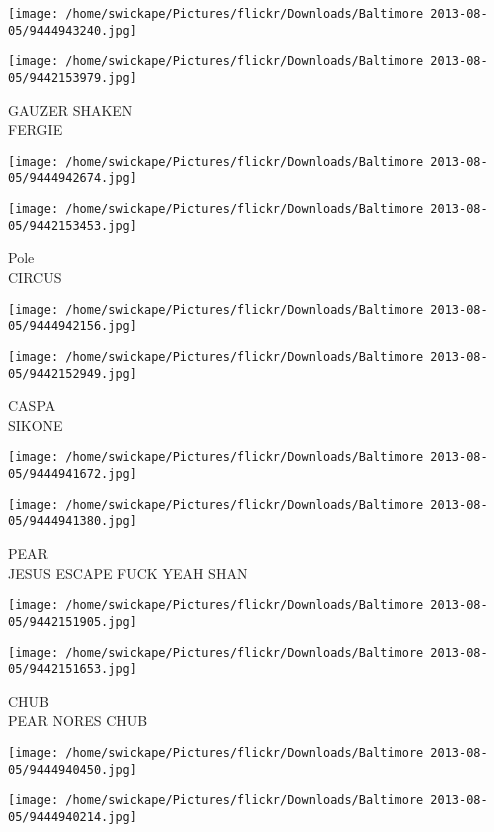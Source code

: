 \documentclass[10pt,letterpaper]{article}
\begin{document}
\texttt{[image: /home/swickape/Pictures/flickr/Downloads/Baltimore 2013-08-05/9444943240.jpg]}

\vspace{0.25in}
\texttt{[image: /home/swickape/Pictures/flickr/Downloads/Baltimore 2013-08-05/9442153979.jpg]}

GAUZER SHAKEN\\
FERGIE
\pagebreak

\texttt{[image: /home/swickape/Pictures/flickr/Downloads/Baltimore 2013-08-05/9444942674.jpg]}

\vspace{0.25in}
\texttt{[image: /home/swickape/Pictures/flickr/Downloads/Baltimore 2013-08-05/9442153453.jpg]}

Pole\\
CIRCUS
\pagebreak

\texttt{[image: /home/swickape/Pictures/flickr/Downloads/Baltimore 2013-08-05/9444942156.jpg]}

\vspace{0.25in}
\texttt{[image: /home/swickape/Pictures/flickr/Downloads/Baltimore 2013-08-05/9442152949.jpg]}

CASPA\\
SIKONE
\pagebreak

\texttt{[image: /home/swickape/Pictures/flickr/Downloads/Baltimore 2013-08-05/9444941672.jpg]}

\vspace{0.25in}
\texttt{[image: /home/swickape/Pictures/flickr/Downloads/Baltimore 2013-08-05/9444941380.jpg]}

PEAR\\
JESUS ESCAPE FUCK YEAH SHAN
\pagebreak

\texttt{[image: /home/swickape/Pictures/flickr/Downloads/Baltimore 2013-08-05/9442151905.jpg]}

\vspace{0.25in}
\texttt{[image: /home/swickape/Pictures/flickr/Downloads/Baltimore 2013-08-05/9442151653.jpg]}

CHUB\\
PEAR NORES CHUB
\pagebreak

\texttt{[image: /home/swickape/Pictures/flickr/Downloads/Baltimore 2013-08-05/9444940450.jpg]}

\vspace{0.25in}
\texttt{[image: /home/swickape/Pictures/flickr/Downloads/Baltimore 2013-08-05/9444940214.jpg]}
\end{document}
